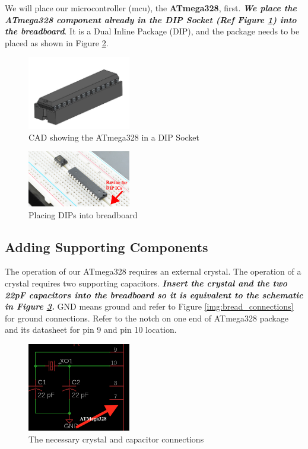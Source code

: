 \documentclass{article}
\begin{document}
We will place our microcontroller (mcu), the \textbf{ATmega328}, first. \textbf{\emph{We place the ATmega328 component already in the DIP Socket (Ref Figure \ref{img:dip_socket}) into the breadboard}}. It is a Dual Inline Package (DIP), and the package needs to be placed as shown in Figure \ref{img:dip_breadboard}. 

\begin{figure}[!h]
    \center
    \includegraphics[width=0.4\textwidth,keepaspectratio]{dip_socket}
    \caption {CAD showing the ATmega328 in a DIP Socket}
    \label{img:dip_socket}
\end{figure}

\pagebreak

\begin{figure}[!h]
    \center
    \includegraphics[width=0.4\textwidth,keepaspectratio]{dip_breadboard}
    \caption {Placing DIPs into breadboard}
    \label{img:dip_breadboard}
\end{figure}

\subsection{Adding Supporting Components}
The operation of our ATmega328 requires an external crystal. The operation of a crystal requires two supporting capacitors. \textbf{\emph{Insert the crystal and the two 22pF capacitors into the breadboard so it is equivalent to the schematic in Figure \ref{img:crystal}.}} GND means ground and refer to Figure \ref{img:bread_connections} for ground connections. Refer to the notch on one end of ATmega328 package and its datasheet for pin 9 and pin 10 location. \par

\begin{figure}[!h]
    \center
    \includegraphics[width=0.4\textwidth,keepaspectratio]{crystal}
    \caption{The necessary crystal and capacitor connections}
    \label{img:crystal}
\end{figure}
\end{document}
